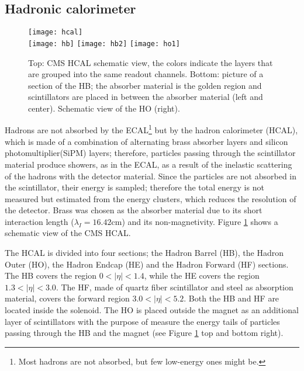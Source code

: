 \subsection{Hadronic calorimeter}

\begin{figure}[h!]
  \centering
  \texttt{[image: hcal]}\\
  \texttt{[image: hb]}
  \texttt{[image: hb2]}
  \texttt{[image: ho1]} 
  \caption[CMS HCAL schematic view]{Top: CMS HCAL schematic view, the colors indicate the layers that are grouped into the same readout channels. Bottom: picture of a section of the HB; the absorber material is the golden region and scintillators are placed in between the absorber material (left and center). Schematic view of the HO (right). \cite{hcal,hb} }
  \label{fig:hcal}
\end{figure}

Hadrons are not absorbed by the ECAL\footnote{Most hadrons are not absorbed, but few low-energy ones might be.} but by the hadron calorimeter (HCAL), which is made of a combination of alternating brass absorber layers and silicon photomultiplier(SiPM) layers; therefore, particles passing through the scintillator material produce showers, as in the ECAL, as a result of the inelastic scattering of the hadrons with the detector material. Since the particles are not absorbed in the scintillator, their energy is sampled; therefore the total energy is not measured but estimated from the energy clusters, which reduces the resolution of the detector. Brass was chosen as the absorber material due to its short interaction length ($\lambda_I=16.42$cm) and its non-magnetivity. Figure \ref{fig:hcal} shows a schematic view of the CMS HCAL.

The HCAL is divided into four sections; the Hadron Barrel (HB), the Hadron Outer (HO), the Hadron Endcap (HE) and the Hadron Forward (HF) sections. The HB covers the region $0<|\eta|<1.4$, while the HE covers the region $1.3<|\eta|<3.0$. The HF, made of quartz fiber scintillator and steel as absorption material, covers the forward region $3.0<|\eta|<5.2$. Both the HB and HF are located inside the solenoid. The HO is placed outside the magnet as an additional layer of scintillators with the purpose of measure the energy tails of particles passing through the HB and the magnet (see Figure \ref{fig:hcal} top and bottom right).%

